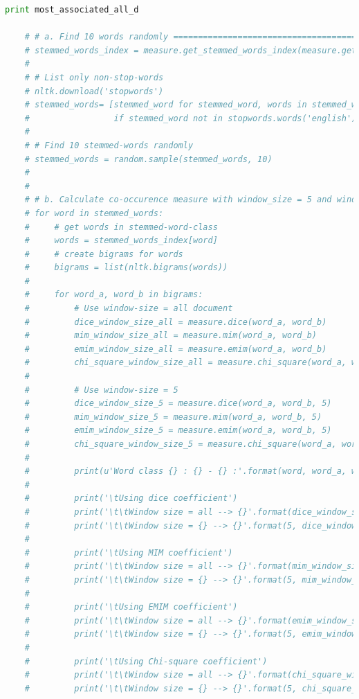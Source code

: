 \documentclass[letterpaper,11pt]{article}
\begin{document}
\begin{lstlisting}[language=python, caption={Association Measure}, label={lst:assoc_measure}]
        print most_associated_all_d

    # # a. Find 10 words randomly =================================================================
    # stemmed_words_index = measure.get_stemmed_words_index(measure.get_window_words_index())
    #
    # # List only non-stop-words
    # nltk.download('stopwords')
    # stemmed_words= [stemmed_word for stemmed_word, words in stemmed_words_index.items()
    #                 if stemmed_word not in stopwords.words('english')]
    #
    # # Find 10 stemmed-words randomly
    # stemmed_words = random.sample(stemmed_words, 10)
    #
    #
    # # b. Calculate co-occurence measure with window_size = 5 and window_size = full-document ===
    # for word in stemmed_words:
    #     # get words in stemmed-word-class
    #     words = stemmed_words_index[word]
    #     # create bigrams for words
    #     bigrams = list(nltk.bigrams(words))
    #
    #     for word_a, word_b in bigrams:
    #         # Use window-size = all document
    #         dice_window_size_all = measure.dice(word_a, word_b)
    #         mim_window_size_all = measure.mim(word_a, word_b)
    #         emim_window_size_all = measure.emim(word_a, word_b)
    #         chi_square_window_size_all = measure.chi_square(word_a, word_b)
    #
    #         # Use window-size = 5
    #         dice_window_size_5 = measure.dice(word_a, word_b, 5)
    #         mim_window_size_5 = measure.mim(word_a, word_b, 5)
    #         emim_window_size_5 = measure.emim(word_a, word_b, 5)
    #         chi_square_window_size_5 = measure.chi_square(word_a, word_b, 5)
    #
    #         print(u'Word class {} : {} - {} :'.format(word, word_a, word_b))
    #
    #         print('\tUsing dice coefficient')
    #         print('\t\tWindow size = all --> {}'.format(dice_window_size_all))
    #         print('\t\tWindow size = {} --> {}'.format(5, dice_window_size_5))
    #
    #         print('\tUsing MIM coefficient')
    #         print('\t\tWindow size = all --> {}'.format(mim_window_size_all))
    #         print('\t\tWindow size = {} --> {}'.format(5, mim_window_size_5))
    #
    #         print('\tUsing EMIM coefficient')
    #         print('\t\tWindow size = all --> {}'.format(emim_window_size_all))
    #         print('\t\tWindow size = {} --> {}'.format(5, emim_window_size_5))
    #
    #         print('\tUsing Chi-square coefficient')
    #         print('\t\tWindow size = all --> {}'.format(chi_square_window_size_all))
    #         print('\t\tWindow size = {} --> {}'.format(5, chi_square_window_size_5))


\end{lstlisting}
\end{document}
